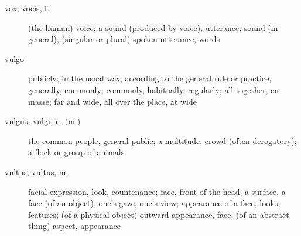 \begin{description}
    \item[vox, vōcis, f.] \marginnote{*}(the human) voice; a sound (produced by voice), utterance; sound (in general); (singular or plural) spoken utterance, words
    \item[vulgō] \marginnote{*}publicly; in the usual way, according to the general rule or practice, generally, commonly; commonly, habitually, regularly; all together, en masse; far and wide, all over the place, at wide
    \item[vulgus, vulgī, n. (m.)] \marginnote{*}the common people, general public; a multitude, crowd (often derogatory); a flock or group of animals
    \item[vultus, vultūs, m.] \marginnote{*}facial expression, look, countenance; face, front of the head; a surface, a face (of an object); one's gaze, one's view; appearance of a face, looks, features; (of a physical object) outward appearance, face; (of an abstract thing) aspect, appearance
\end{description}
